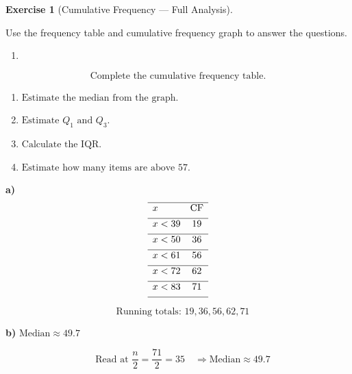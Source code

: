 \documentclass[
  letterpaper,
  DIV=11,
  numbers=noendperiod]{scrreprt}
\providecommand{\tightlist}{%
  \setlength{\itemsep}{0pt}\setlength{\parskip}{0pt}}
\theoremstyle{definition}
\newtheorem{exercise}{Exercise}[chapter]
\theoremstyle{remark}
\begin{document}
\begin{exercise}[Cumulative Frequency --- Full
Analysis]\protect\hypertarget{exr-cf-6}{}\label{exr-cf-6}

Use the frequency table and cumulative frequency graph to answer the
questions.

\begin{enumerate}
\def\labelenumi{\alph{enumi})}
\tightlist
\item
\end{enumerate}

\[\text{Complete the cumulative frequency table.}\]

\begin{enumerate}
\def\labelenumi{\alph{enumi})}
\setcounter{enumi}{1}
\item
  \(\text{Estimate the median from the graph.}\)
\item
  \(\text{Estimate }Q_1\text{ and }Q_3.\)
\item
  \(\text{Calculate the IQR.}\)
\item
  \(\text{Estimate how many items are above }57.\)
\end{enumerate}

\begin{tcolorbox}[enhanced jigsaw, opacitybacktitle=0.6, coltitle=black, arc=.35mm, colframe=quarto-callout-tip-color-frame, colback=white, bottomrule=.15mm, left=2mm, colbacktitle=quarto-callout-tip-color!10!white, titlerule=0mm, opacityback=0, title=\textcolor{quarto-callout-tip-color}{\faLightbulb}\hspace{0.5em}{🔍 View Solution}, leftrule=.75mm, breakable, rightrule=.15mm, bottomtitle=1mm, toptitle=1mm, toprule=.15mm]

\textbf{a)} \[\begin{array}{lc}
\hline x & \text{CF} \\[4pt]
\hline x < 39 & 19 \\[4pt]
\hline x < 50 & 36 \\[4pt]
\hline x < 61 & 56 \\[4pt]
\hline x < 72 & 62 \\[4pt]
\hline x < 83 & 71 \\[4pt]
\hline
\end{array}\]

\[\quad \text{Running totals: }19, 36, 56, 62, 71\]

\textbf{b)} \(\text{Median} \approx 49.7\)

\[\quad \text{Read at }\frac{n}{2}=\frac{71}{2}=35\quad \Rightarrow \text{Median}\approx49.7\]


\end{tcolorbox}
\end{exercise}
\end{document}
